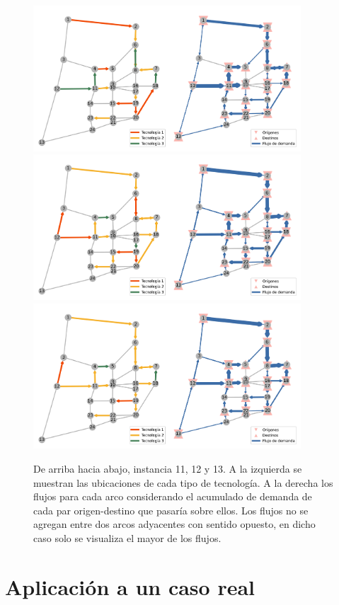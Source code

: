 \begin{figure}[h!]
  \centering
  \includegraphics[width=10cm]{../resources/sioux_falls_0.4_budget_factor_linear_5_breakpoints.png}
  \includegraphics[width=10cm]{../resources/sioux_falls_0.4_budget_factor_linear_20_breakpoints.png}
  \includegraphics[width=10cm]{../resources/sioux_falls_0.4_budget_factor_linear_50_breakpoints.png}
  \caption{De arriba hacia abajo, instancia 11, 12 y 13. A la izquierda se muestran las ubicaciones de cada tipo de tecnología. A la derecha los flujos para cada arco considerando el acumulado de demanda de cada par origen-destino que pasaría sobre ellos. Los flujos no se agregan entre dos arcos adyacentes con sentido opuesto, en dicho caso solo se visualiza el mayor de los flujos.}
  \label{fig:sensibilityinstance11_12_13}
\end{figure}

\FloatBarrier
\section{Aplicación a un caso real}

